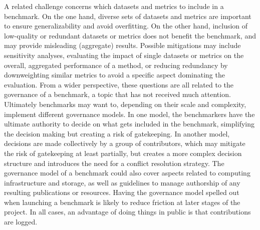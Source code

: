 \documentclass[11pt]{article}
\begin{document}
A related challenge concerns which datasets and metrics to include in a benchmark. On the one hand, diverse sets of datasets and metrics are important to ensure generalizability and avoid overfitting. On the other hand, inclusion of low-quality or redundant datasets or metrics does not benefit the benchmark, and may provide misleading (aggregate) results. Possible mitigations may include sensitivity analyses, evaluating the impact of single datasets or metrics on the overall, aggregated performance of a method, or reducing redundancy by downweighting similar metrics to avoid a specific aspect dominating the evaluation. From a wider perspective, these questions are all related to the governance of a benchmark, a topic that has not received much attention. Ultimately benchmarks may want to, depending on their scale and complexity, implement different governance models. In one model, the benchmarkers have the ultimate authority to decide on what gets included in the benchmark, simplifying the decision making but creating a risk of gatekeeping. In another model, decisions are made collectively by a group of contributors, which may mitigate the risk of gatekeeping at least partially, but creates a more complex decision structure and introduces the need for a conflict resolution strategy. The governance model of a benchmark could also cover aspects related to computing infrastructure and storage, as well as guidelines to manage authorship of any resulting publications or resources. Having the governance model spelled out when launching a benchmark is likely to reduce friction at later stages of the project. In all cases, an advantage of doing things in public is that contributions are logged. 
\end{document}
